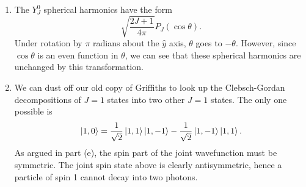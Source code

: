 \documentclass[12pt]{article}
\begin{document}
\begin{enumerate}[label=(\alph*)]
    \item The $Y_J^{0}$ spherical harmonics have the form
    \[ \sqrt{\frac{2J+1}{4\pi}}P_J(\cos\theta). \]
    Under rotation by $\pi$ radians about the $\hat{y}$ axis, $\theta$ goes to $-\theta$. However, since $\cos\theta$ is an even function in $\theta$, we can see that these spherical harmonics are unchanged by this transformation.

    \item We can dust off our old copy of Griffiths to look up the Clebsch-Gordan decompositions of $J = 1$ states into two other $J = 1$ states. The only one possible is
    \[ \ket{1,0} = \frac{1}{\sqrt{2}}\ket{1,1}\ket{1,-1} - \frac{1}{\sqrt{2}}\ket{1,-1}\ket{1,1}. \]
    As argued in part (e), the spin part of the joint wavefunction must be symmetric. The joint spin state above is clearly antisymmetric, hence a particle of spin 1 cannot decay into two photons.

\end{enumerate}
\end{document}
